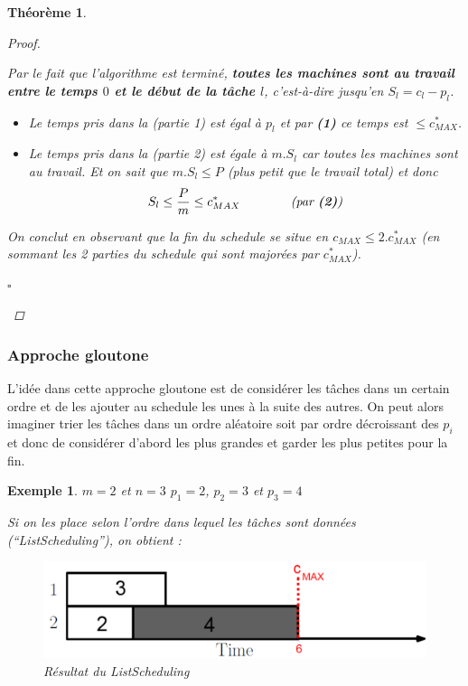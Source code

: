 \documentclass{article}
\newcommand{\cqfd}{\begin{flushright}$\square$\end{flushright}}
\newtheorem{exemple}{Exemple}[section]
\newtheorem{thm}{Th\'eor\`eme}[section]
\newtheorem{proof}{Preuve}[section]
\begin{document}
\begin{sffamily}
\begin{thm}
\begin{proof}
\begin{enumerate}
\newpage
Par le fait que l'algorithme est terminé, \textbf{toutes les machines sont au travail entre le temps $0$ et le début de la tâche $l$},
c'est-à-dire jusqu'en $S_l = c_l-p_l$.

\begin{itemize}
\item Le temps pris dans la \textit{(partie 1)} est égal à $p_l$ et par \textbf{(1)} ce temps est $\leq c^*_{MAX}$.
\item Le temps pris dans la \textit{(partie 2)} est égale à $m.S_l$ car toutes les machines sont au travail. Et on sait que $m.S_l \leq
P$ \textit{(plus petit que le travail total)} et donc $$S_l \leq \frac{P}{m} \leq c^*_{MAX} \qquad\qquad \text{\textit{(par
\textbf{(2)})}}$$
\end{itemize}
On conclut en observant que la fin du schedule se situe en $c_{MAX} \leq 2.c^*_{MAX}$ (en sommant les 2 parties du schedule qui sont
majorées par $c^*_{MAX}$).
\end{enumerate}
\cqfd
\end{proof}
\end{thm}

\subsubsection{Approche gloutone}

L'idée dans cette approche gloutone est de considérer les tâches dans un certain ordre et de les ajouter au schedule les unes à la suite
des autres. On peut alors imaginer trier les tâches dans un ordre aléatoire soit par ordre décroissant des $p_i$ et donc de considérer
d'abord les plus grandes et garder les plus petites pour la fin.

\begin{exemple}$m=2$ et $n=3$
$p_1 = 2$, $p_2 = 3$ et $p_3=4$

Si on les place selon l'ordre dans lequel les tâches sont données \textit{(``ListScheduling'')}, on obtient :

\begin{figure}[h!]
    \begin{center}
    \includegraphics[scale=0.3]{spm5.pdf}
    \caption{Résultat du ListScheduling}
    \end{center}
\end{figure}


\end{exemple}
\end{sffamily}
\end{document}
